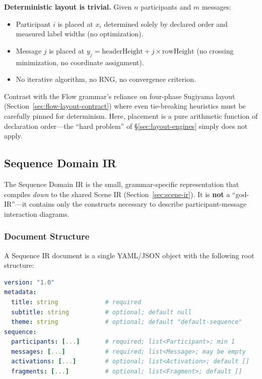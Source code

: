 \textbf{Deterministic layout is trivial.} Given $n$ participants and $m$ messages:
\begin{itemize}
  \item Participant $i$ is placed at $x_i$ determined solely by declared order and measured label widths (no optimization).
  \item Message $j$ is placed at $y_j = \text{headerHeight} + j \times \text{rowHeight}$ (no crossing minimization, no coordinate assignment).
  \item No iterative algorithm, no RNG, no convergence criterion.
\end{itemize}

Contrast with the Flow grammar's reliance on four-phase Sugiyama layout (Section~\ref{sec:flow-layout-contract}) where even tie-breaking heuristics must be carefully pinned for determinism. Here, placement is a pure arithmetic function of declaration order---the ``hard problem'' of \S\ref{sec:layout-engines} simply does not apply.

\subsection{Sequence Domain IR}
\label{sec:sequence-domain-ir}

The Sequence Domain IR is the small, grammar-specific representation that compiles \emph{down} to the shared Scene IR (Section~\ref{sec:scene-ir}). It is \textbf{not} a ``god-IR''---it contains only the constructs necessary to describe participant-message interaction diagrams.

\subsubsection{Document Structure}

A Sequence IR document is a single YAML/JSON object with the following root structure:

\begin{lstlisting}[language=yaml,caption={Sequence IR root document structure}]
version: "1.0"
metadata:
  title: string             # required
  subtitle: string          # optional; default null
  theme: string             # optional; default "default-sequence"
sequence:
  participants: [...]       # required; list<Participant>; min 1
  messages: [...]           # required; list<Message>; may be empty
  activations: [...]        # optional; list<Activation>; default []
  fragments: [...]          # optional; list<Fragment>; default []
\end{lstlisting}

